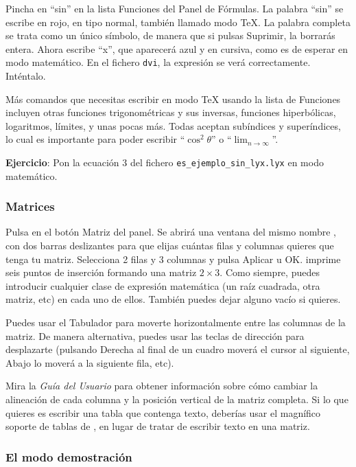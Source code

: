 Pincha en {}``sin'' en la lista \textsf{Funciones} del \textsf{Panel
de Fórmulas}. La palabra {}``sin'' se escribe en rojo, en tipo normal,
también llamado modo \TeX{}. La palabra completa se trata como un
único símbolo, de manera que si pulsas \textsf{Suprimir}, la borrarás
entera. Ahora escribe {}``x'', que aparecerá azul y en cursiva,
como es de esperar en modo matemático. En el fichero \texttt{dvi},
la expresión se verá correctamente. Inténtalo.

Más comandos que necesitas escribir en modo \TeX{} usando la lista
de \textsf{Funciones} incluyen otras funciones trigonométricas y sus
inversas, funciones hiperbólicas, logaritmos, límites, y unas pocas
más. Todas aceptan subíndices y superíndices, lo cual es importante
para poder escribir {}``$\cos^{2}\theta$'' o {}``$\lim_{n\rightarrow\infty}$''.

\textbf{Ejercicio}: Pon la ecuación 3 del fichero \texttt{es\_ejemplo\_sin\_lyx.lyx}
en modo matemático.


\subsubsection{Matrices}

\label{sec:matrices}Pulsa en el botón \textsf{Matriz} del panel.
Se abrirá una ventana del mismo nombre , con dos barras deslizantes
para que elijas cuántas filas y columnas quieres que tenga tu matriz.
Selecciona 2 filas y 3 columnas y pulsa \textsf{Aplicar} u \textsf{OK}.
\LyX{} imprime seis puntos de inserción formando una matriz $2\times3$.
Como siempre, puedes introducir cualquier clase de expresión matemática
(un raíz cuadrada, otra matriz, etc) en cada uno de ellos. También
puedes dejar alguno vacío si quieres.

Puedes usar el \textsf{Tabulador} para moverte horizontalmente entre
las columnas de la matriz. De manera alternativa, puedes usar las
teclas de dirección para desplazarte (pulsando \textsf{Derecha} al
final de un cuadro moverá el cursor al siguiente, \textsf{Abajo} lo
moverá a la siguiente fila, etc).

Mira la \emph{Guía del Usuario} para obtener información sobre cómo
cambiar la alineación de cada columna y la posición vertical de la
matriz completa. Si lo que quieres es escribir una tabla que contenga
texto, deberías usar el magnífico soporte de tablas de \LyX{}, en
lugar de tratar de escribir texto en una matriz.


\subsubsection{El modo demostración}

